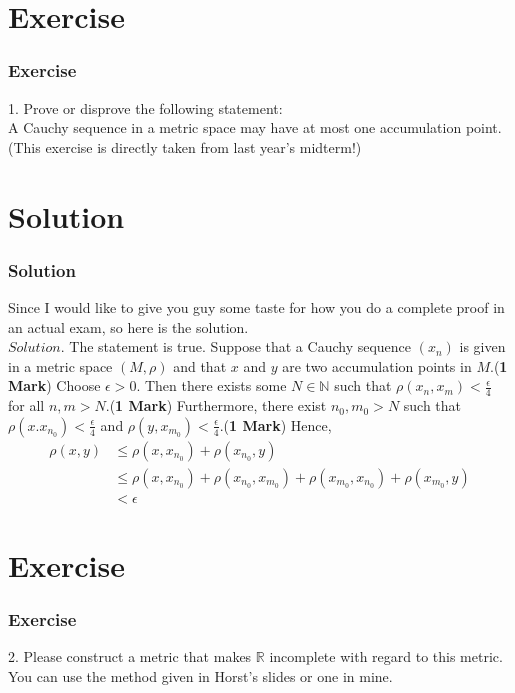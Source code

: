 \documentclass[12pt, t]{beamer}
\begin{document}
\section{Exercise}
\begin{frame}
    \frametitle{Exercise}
1. Prove or disprove the following statement:\\
\hspace{1em} A Cauchy sequence in a metric space may have at most one accumulation point.\\
(This exercise is directly taken from last year's midterm!)
\end{frame}

\section{Solution}
\begin{frame}
    \frametitle{Solution}
Since I would like to give you guy some taste for how you do a complete proof in an actual exam, so here is the solution.\\
\vspace{2em}
$Solution.$\hspace{1em} The statement is true. Suppose that a Cauchy sequence $(x_n)$ is given in a metric space $(M,\rho)$ and that 
$x$ and $y$ are two accumulation points in $M$.(\textbf{1 Mark}) Choose $\epsilon>0$. Then there exists some $N\in\mathbb{N}$ such that 
$\rho(x_n,x_m)<\frac{\epsilon}{4}$ for all $n,m>N$.(\textbf{1 Mark}) Furthermore, there exist $n_0,m_0>N$ such  that $\rho(x.x_{n_0})<\frac{\epsilon}{4}$ and 
$\rho(y,x_{m_0})<\frac{\epsilon}{4}$.(\textbf{1 Mark}) Hence,
\begin{equation*}
    \begin{split}
        \rho(x,y)&\leq\rho(x,x_{n_0})+\rho(x_{n_0},y)\\
        &\leq\rho(x,x_{n_0})+\rho(x_{n_0},x_{m_0})+\rho(x_{m_0},x_{n_0})+\rho(x_{m_0},y)\\
        &<\epsilon
    \end{split}
\end{equation*}
\end{frame}

\section{Exercise}
\begin{frame}
    \frametitle{Exercise}
2. Please construct a metric that makes $\mathbb{R}$ incomplete with regard to this metric. You can use the method given in 
Horst's slides or one in mine.
\end{frame}
\end{document}
